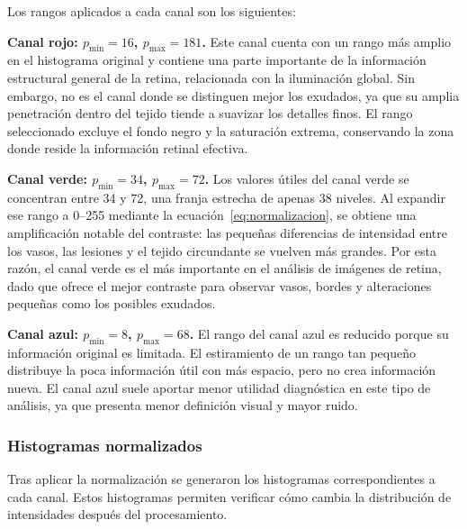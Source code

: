 \documentclass[11pt]{article}
\begin{document}
Los rangos aplicados a cada canal son los siguientes:

\textbf{Canal rojo: $p_{\min} = 16$, $p_{\max} = 181$.} Este canal cuenta con un rango más amplio en el histograma original y contiene una parte importante de la información estructural general de la retina, relacionada con la iluminación global. Sin embargo, no es el canal donde se distinguen mejor los exudados, ya que su amplia penetración dentro del tejido tiende a suavizar los detalles finos. El rango seleccionado excluye el fondo negro y la saturación extrema, conservando la zona donde reside la información retinal efectiva.

\textbf{Canal verde: $p_{\min} = 34$, $p_{\max} = 72$.} Los valores útiles del canal verde se concentran entre 34 y 72, una franja estrecha de apenas 38 niveles. Al expandir ese rango a 0--255 mediante la ecuación~\eqref{eq:normalizacion}, se obtiene una amplificación notable del contraste: las pequeñas diferencias de intensidad entre los vasos, las lesiones y el tejido circundante se vuelven más grandes. Por esta razón, el canal verde es el más importante en el análisis de imágenes de retina, dado que ofrece el mejor contraste para observar vasos, bordes y alteraciones pequeñas como los posibles exudados.

\textbf{Canal azul: $p_{\min} = 8$, $p_{\max} = 68$.} El rango del canal azul es reducido porque su información original es limitada. El estiramiento de un rango tan pequeño distribuye la poca información útil con más espacio, pero no crea información nueva. El canal azul suele aportar menor utilidad diagnóstica en este tipo de análisis, ya que presenta menor definición visual y mayor ruido.

\subsubsection{Histogramas normalizados}

Tras aplicar la normalización se generaron los histogramas correspondientes a cada canal. Estos histogramas permiten verificar cómo cambia la distribución de intensidades después del procesamiento.
\end{document}
